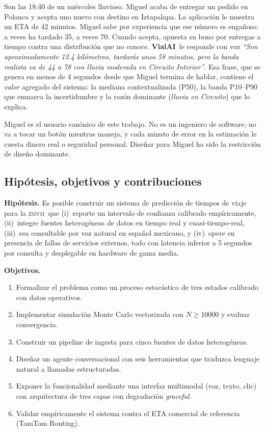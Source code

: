 \documentclass[11pt,a4paper]{article}
\newcommand{\VialAI}{\textbf{\textcolor{vialTeal}{Vial}\textcolor{vialAmber}{AI}}}
\newcommand{\ZMVM}{\textsc{zmvm}}
\begin{document}
\begin{casebox}
\small\noindent
Son las 18:40 de un miércoles lluvioso. Miguel acaba de
entregar un pedido en Polanco y acepta uno nuevo con destino en
Iztapalapa. La aplicación le muestra un ETA de \num{42} minutos.
Miguel sabe por experiencia que ese número es engañoso: a veces ha
tardado \num{35}, a veces \num{70}. Cuando acepta, apuesta su bono
por entregas a tiempo contra una distribución que no conoce.
\VialAI\ le responde con voz \emph{``Son aproximadamente
\num{12.4} kilómetros, tardarás unos \num{58} minutos, pero la banda
realista va de \num{44} a \num{78} con lluvia moderada en
Circuito Interior''}. Esa frase, que se genera en menos de
\num{4} segundos desde que Miguel termina de hablar, contiene el
\emph{valor} agregado del sistema: la mediana contextualizada
(P50), la banda P10--P90 que enmarca la incertidumbre y la razón
dominante (\emph{lluvia en Circuito}) que lo explica.
\end{casebox}

Miguel es el usuario canónico de este trabajo. No es un ingeniero
de software, no va a tocar un botón mientras maneja, y cada minuto
de error en la estimación le cuesta dinero real o seguridad
personal. Diseñar para Miguel ha sido la restricción de diseño
dominante.

\subsection{Hipótesis, objetivos y contribuciones}

\textbf{Hipótesis.} Es posible construir un sistema de predicción
de tiempos de viaje para la \ZMVM\ que (i)~reporte un intervalo
de confianza calibrado empíricamente, (ii)~integre fuentes
heterogéneas de datos en tiempo real y cuasi-tiempo-real,
(iii)~sea consultable por voz natural en español mexicano, y
(iv)~opere en presencia de fallas de servicios externos, todo con
latencia inferior a \num{5} segundos por consulta y desplegable
en hardware de gama media.

\textbf{Objetivos.}

\begin{enumerate}
\item Formalizar el problema como un proceso estocástico de tres
estados calibrado con datos operativos.
\item Implementar simulación Monte Carlo vectorizada con
$N \geq \num{10000}$ y evaluar convergencia.
\item Construir un pipeline de ingesta para cinco fuentes de datos
heterogéneas.
\item Diseñar un agente conversacional con seis herramientas que
traduzca lenguaje natural a llamadas estructuradas.
\item Exponer la funcionalidad mediante una interfaz multimodal
(voz, texto, clic) con arquitectura de tres capas con
degradación \emph{graceful}.
\item Validar empíricamente el sistema contra el ETA comercial de
referencia (TomTom Routing).
\end{enumerate}
\end{document}

